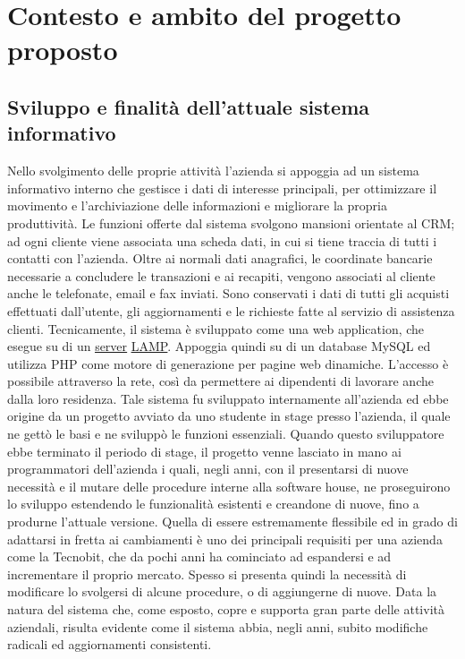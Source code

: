 \chapter{Contesto e ambito del progetto proposto}
\section{Sviluppo e finalit\` a dell'attuale sistema informativo}
Nello svolgimento delle proprie attivit\`a l'azienda si appoggia ad un sistema informativo interno che gestisce i dati di interesse principali, per ottimizzare il movimento e l'archiviazione delle informazioni e migliorare la propria produttivit\`a. Le funzioni offerte dal sistema svolgono mansioni orientate al CRM; ad ogni cliente viene associata una scheda dati, in cui si tiene traccia di tutti i contatti con l'azienda. Oltre ai normali dati anagrafici, le coordinate bancarie necessarie a concludere le transazioni e ai recapiti, vengono associati al cliente anche le telefonate, email e fax inviati. Sono conservati i dati di tutti gli acquisti effettuati dall'utente, gli aggiornamenti e le richieste fatte al servizio di assistenza clienti. Tecnicamente, il sistema \`e sviluppato come una web application, che esegue su di un \hyperlink{server}{\underline{server}} \hyperlink{lamp}{\underline{LAMP}}. Appoggia quindi su di un database MySQL ed utilizza PHP come motore di generazione per pagine web dinamiche. L'accesso \`e possibile attraverso la rete, cos\`i da permettere ai dipendenti di lavorare anche dalla loro residenza. Tale sistema fu sviluppato internamente all'azienda ed ebbe origine da un progetto avviato da uno studente in stage presso l'azienda, il quale ne gett\`o le basi e ne svilupp\`o le funzioni essenziali. Quando questo sviluppatore ebbe terminato il periodo di stage, il progetto venne lasciato in mano ai programmatori dell'azienda i quali, negli anni, con il presentarsi di nuove necessit\`a e il mutare delle procedure interne alla software house, ne proseguirono lo sviluppo estendendo le funzionalit\`a esistenti e creandone di nuove, fino a produrne l'attuale versione. Quella di essere estremamente flessibile ed in grado di adattarsi in fretta ai cambiamenti \`e uno dei principali requisiti per una azienda come la Tecnobit, che da pochi anni ha cominciato ad espandersi e ad incrementare il proprio mercato. Spesso si presenta quindi la necessit\`a di modificare lo svolgersi di alcune procedure, o di aggiungerne di nuove. Data la natura del sistema che, come esposto, copre e supporta gran parte delle attivit\`a aziendali, risulta evidente come il sistema abbia, negli anni, subito modifiche radicali ed aggiornamenti consistenti.


